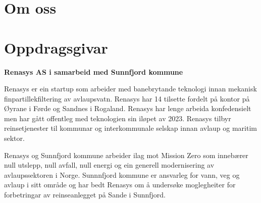 
\thispagestyle{fancy}

\section{Om oss}




\section{Oppdragsgivar}
\textbf{Renasys AS i samarbeid med Sunnfjord kommune}

Renasys er ein startup som arbeider med banebrytande teknologi innan mekanisk finpartillekfiltering av avlaupsvatn.
Renasys har 14 tilsette fordelt på kontor på Øyrane i Førde og Sandnes i Rogaland. Renasys har lenge arbeida konfedensielt men har gått offentleg med teknologien sin iløpet av 2023. Renasys tilbyr reinsetjenester til kommunar og interkommunale selskap innan avlaup og maritim sektor.

Renasys og Sunnfjord kommune arbeider ilag mot Mission Zero som innebærer null utslepp, null avfall, null energi og ein generell modernisering av avlaupssektoren i Norge.
Sunnnfjord kommune er ansvarleg for vann, veg og avlaup i sitt område og har bedt Renasys om å undersøke moglegheiter for forbetringar av reinseanlegget på Sande i Sunnfjord.